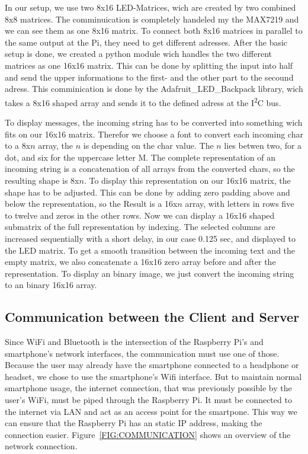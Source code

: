 \documentclass[conference]{IEEEtran}
\begin{document}
In our setup, we use two 8x16 LED-Matrices, wich are created by two combined 8x8 matrices. The comminuication is completely handeled my the MAX7219 and we can see them as one 8x16 matrix. To connect both 8x16 matrices in parallel to the same output at the Pi, they need to get different adresses.
After the basic setup is done, we created a python module wich handles the two different matrices as one 16x16 matrix. This can be done by splitting the input into half and send the upper informations to the first- and the other part to the secound adress. This comminication is done by the Adafruit\_LED\_Backpack\cite{ledlibrary} library, wich takes a 8x16 shaped array and sends it to the defined adress at the I\textsuperscript{2}C bus.

To display messages, the incoming string has to be converted into something wich fits on our 16x16 matrix. Therefor we choose a font to convert each incoming char to a 8x$n$ array, the $n$ is depending on the char value. The $n$ lies betwen two, for a dot, and six for the uppercase letter M. The complete representation of an incoming string is a concatenation of all arrays from the converted chars, so the resulting shape is 8x$n$. To display this representation on our 16x16 matrix, the shape has to be adjusted. This can be done by adding zero padding above and below the representation, so the Result is a 16x$n$ array, with letters in rows five to twelve and zeros in the other rows. Now we can display a 16x16 shaped submatrix of the full representation by indexing. The selected columns are increased sequentially with a short delay, in our case 0.125 sec, and displayed to the LED matrix. To get a smooth transition between the incoming text and the empty matrix, we also concatenate a 16x16 zero array before and after the representation. To display an binary image, we just convert the incoming string to an binary 16x16 array.

\subsection{Communication between the Client and Server}\label{SEC:COMMUNICATIONCLIENTSERVER}
Since WiFi and Bluetooth is the intersection of the Raspberry Pi's and smartphone's network interfaces, the communication must use one of those. Because the user may already have the smartphone connected to a headphone or headset, we chose to use the smartphone's Wifi interface. But to maintain normal smartphone usage, the internet connection, that was previously possible by the user's WiFi, must be piped through the Raspberry Pi. It must be connected to the internet via LAN and act as an access point for the smartpone. This way we can ensure that the Raspberry Pi has an static IP address, making the connection easier. Figure~\ref{FIG:COMMUNICATION} shows an overview of the network connection.
\end{document}
